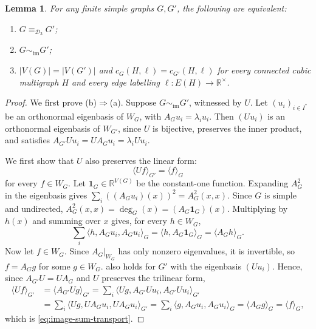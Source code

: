 \documentclass[11pt,a4paper]{article}
\theoremstyle{plain}
\newtheorem{lemma}[theorem]{Lemma}
\theoremstyle{definition}
\newcommand{\R}{\mathbb{R}}
\newcommand{\ones}{\mathbf{1}}
\begin{document}
\begin{lemma}\label{lem:characterisation}
 For any finite simple graphs $G,G'$, the following are equivalent:
 \begin{enumerate}
 \item[(a)] $G\equiv_{\mathcal D_3}G'$;
 \item[(b)] $G\sim_{\mathrm{im}}G'$;
 \item[(c)] $|V(G)|=|V(G')|$ and $c_G(H,\ell)=c_{G'}(H,\ell)$ for every
 connected cubic multigraph $H$ and every edge labelling
 $\ell:E(H)\to\R^\times$.
 \end{enumerate}
\end{lemma}
\begin{proof}
We first prove (b)$\Rightarrow$(a).
Suppose $G\sim_{\mathrm{im}}G'$, witnessed by $U$.
Let $(u_i)_{i\in I^*}$ be an orthonormal eigenbasis of $W_G$, with
$A_Gu_i=\lambda_i u_i$. Then $(Uu_i)$ is an orthonormal eigenbasis of
$W_{G'}$, since $U$ is bijective, preserves the inner product, and
satisfies $A_{G'}Uu_i=UA_Gu_i=\lambda_i Uu_i$.

We first show that $U$ also preserves the linear form:
\begin{equation}\label{eq:image-sum-transport}
 \langle Uf\rangle_{G'}=\langle f\rangle_G
\end{equation}
for every $f\in W_G$.
Let $\ones_G\in\R^{V(G)}$ be the constant-one function.
Expanding $A_G^2$ in the eigenbasis gives
$\sum_i ((A_Gu_i)(x))^2=A_G^2(x,x)$.
Since $G$ is simple and undirected,
$A_G^2(x,x)=\deg_G(x)=(A_G\ones_G)(x)$.
Multiplying by $h(x)$ and summing over $x$ gives, for every $h\in W_G$,
\begin{equation}\label{eq:image-linear}
 \sum_i\langle h,A_Gu_i,A_Gu_i\rangle_G
 =\langle h,A_G\ones_G\rangle_G
 =\langle A_Gh\rangle_G.
\end{equation}
Now let $f\in W_G$. Since $A_G|_{W_G}$ has only nonzero eigenvalues,
it is invertible, so $f=A_Gg$ for some $g\in W_G$.
 also holds for $G'$ with the eigenbasis
$(Uu_i)$. Hence, since $A_{G'}U=UA_G$ and $U$ preserves the trilinear
form,
\begin{equation}\label{eq:commentary-linear-transport}
 \begin{aligned}
 \langle Uf\rangle_{G'}
 &=\langle A_{G'}Ug\rangle_{G'}
 =\sum_i\langle Ug,A_{G'}Uu_i,A_{G'}Uu_i\rangle_{G'}\\
 &=\sum_i\langle Ug,UA_Gu_i,UA_Gu_i\rangle_{G'}
 =\sum_i\langle g,A_Gu_i,A_Gu_i\rangle_G
 =\langle A_Gg\rangle_G
 =\langle f\rangle_G,
 \end{aligned}
\end{equation}
which is \cref{eq:image-sum-transport}.


\end{proof}
\end{document}
